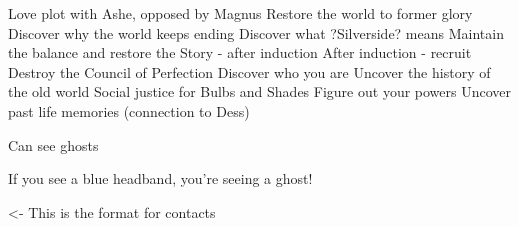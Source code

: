 \documentclass[char]{Silversiders}
\begin{document}
\name{\cWisdom{}}

Love plot with Ashe, opposed by Magnus
Restore the world to former glory
Discover why the world keeps ending
Discover what ?Silverside? means
Maintain the balance and restore the Story - after induction
After induction - recruit
Destroy the Council of Perfection
Discover who you are
Uncover the history of the old world
Social justice for Bulbs and Shades
Figure out your powers
Uncover past life memories (connection to Dess)

Can see ghosts

\begin{itemz}[Goals]
	\item 
\end{itemz}

\begin{itemz}[Notes]
	\item If you see a blue headband, you're seeing a ghost!
\end{itemz}

\begin{contacts}
	\contact{\cTest{}} <- This is the format for contacts 
\end{contacts}
\end{document}
